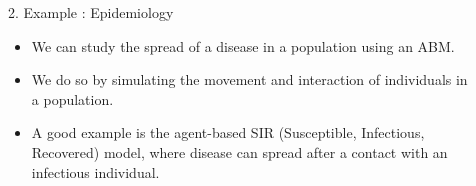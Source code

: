 \documentclass[final,hyperref={pdfpagelabels=false}]{beamer}
\newcommand{\shrink}{-15pt}
\begin{document}
\begin{frame}[t]
\begin{columns}[t]
\begin{column}{.4\textwidth}
  \end{column} %


  \begin{column}{.02\textwidth}\end{column} %

  \begin{column}{.55\textwidth} %
    \vspace{\shrink}
    \begin{block}{2. Example : Epidemiology}
      \begin{itemize}
        \item We can study the spread of a disease in a population using an ABM.
        \item We do so by simulating the movement and interaction of individuals in a population.
        \item A good example is the agent-based SIR (Susceptible, Infectious, Recovered) model, where disease can spread after a contact with an infectious individual.
        \vspace{1cm}
          \begin{figure}
            \captionsetup[subfigure]{justification=centering}
            \begin{subfigure}[t]{0.3 \columnwidth}
\end{subfigure}
\end{figure}
\end{itemize}
\end{block}
\end{column}
\end{columns}
\end{frame}
\end{document}
